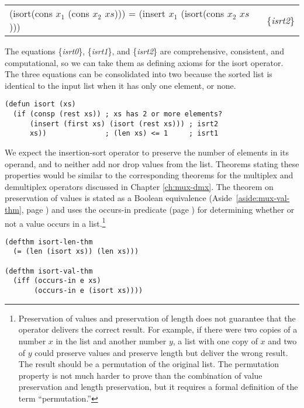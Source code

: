 \begin{center}
\label{eq:isrt2}
\begin{tabular}{ll}
(isort(cons $x_1$ (cons $x_2$ $xs$))) = (insert $x_1$ (isort(cons $x_2$ $xs$))) & \{\emph{isrt2}\} \\
\end{tabular}
\end{center}

The equations \{\emph{isrt0}\}, \{\emph{isrt1}\}, and \{\emph{isrt2}\}
are comprehensive, consistent, and computational,
so we can take them as defining axioms for the isort operator.
The three equations can be consolidated into two because
the sorted list is identical to the input list when it has
only one element, or none.

\label{defun:isort}
\begin{Verbatim}
(defun isort (xs)
  (if (consp (rest xs)) ; xs has 2 or more elements?
      (insert (first xs) (isort (rest xs))) ; isrt2
      xs))              ; (len xs) <= 1     ; isrt1
\end{Verbatim}

We expect the insertion-sort operator to preserve
the number of elements in its operand, and to
neither add nor drop values from the list.
Theorems stating these properties would be
similar to the corresponding theorems for
the multiplex and demultiplex operators discussed
in Chapter \ref{ch:mux-dmx}.
The theorem on preservation of values is
stated as a Boolean equivalence
(Aside~\ref{aside:mux-val-thm}, page \pageref{aside:mux-val-thm})
and uses the occurs-in predicate
(page \pageref{def:occurs-in}) for determining
whether or not a value occurs in a list.\footnote{Preservation
of values and preservation of length does not guarantee
that the operator delivers the correct result.
For example, if there were two copies of a number $x$ in the list
and another number $y$, a list with one copy of $x$
and two of $y$ could preserve values and preserve
length but deliver the wrong result.
The result should be a permutation of the original list.
The permutation property is not much harder
to prove than the combination of value preservation and length preservation,
but it requires a formal definition of the term ``permutation.''}

\label{defthm:isort-len}
\label{defthm:isort-val}
\begin{Verbatim}
(defthm isort-len-thm
  (= (len (isort xs)) (len xs)))

(defthm isort-val-thm
  (iff (occurs-in e xs)
       (occurs-in e (isort xs))))
\end{Verbatim}

